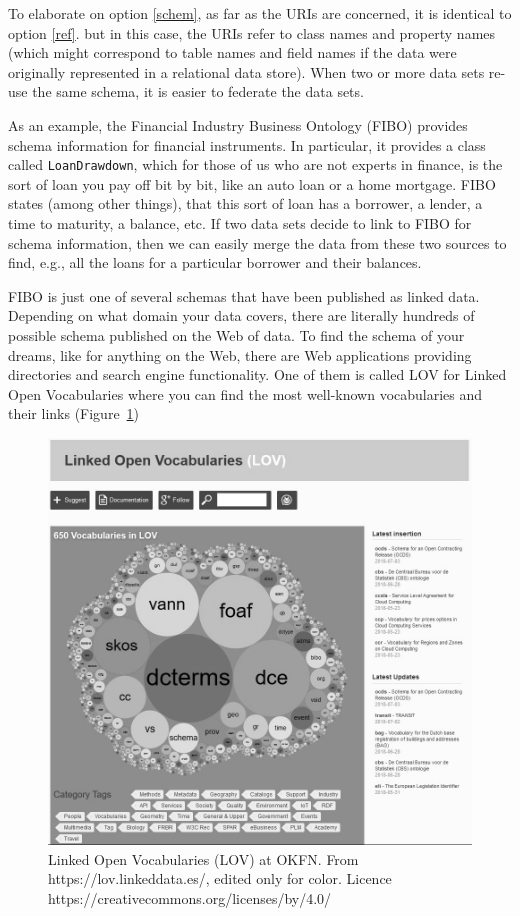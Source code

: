 To elaborate on option \ref{schem}, as far as the URIs are concerned, it is identical to option \ref{ref}. 
but in this case, the URIs refer to class names and property names (which might correspond to table names and field names 
if the data were originally represented in a relational data store).  
When two or more data sets re-use the same schema, it is easier to federate the data sets.  

As an example, the Financial Industry Business Ontology (FIBO)\cite{fibospec} provides 
schema information for financial instruments.  In particular, it provides a class called \texttt{LoanDrawdown}, which 
for those of us who are not experts in finance, is the sort of loan you pay off bit by bit, like an auto loan or a home 
mortgage. 
FIBO states (among other things), that this sort of loan has a borrower, a lender, a time to maturity, a balance, etc. If 
two data sets decide to link to FIBO for schema information, then we can easily merge the data from these two sources to 
find, e.g., all the loans for a particular borrower and their balances. 

FIBO is just one of several schemas that have been published as linked data.  Depending on what domain 
your data covers, there are literally hundreds of possible schema published on the Web of data. 
To find the schema of your dreams, like for anything on the Web, there
are Web applications providing directories and search engine
functionality. One of them is called LOV for Linked Open
Vocabularies \cite{vandenbussche2017linked} where you can find the
most well-known vocabularies and their links (Figure~\ref{fig:ch5.12})

\begin{figure}
    \centering
\includegraphics[width=5.0in]{media/ch5/figure-05-12.jpg}
    \caption{Linked Open Vocabularies (LOV) at OKFN.  From https://lov.linkeddata.es/, edited only for color. Licence https://creativecommons.org/licenses/by/4.0/}
    \label{fig:ch5.12}
\end{figure}

